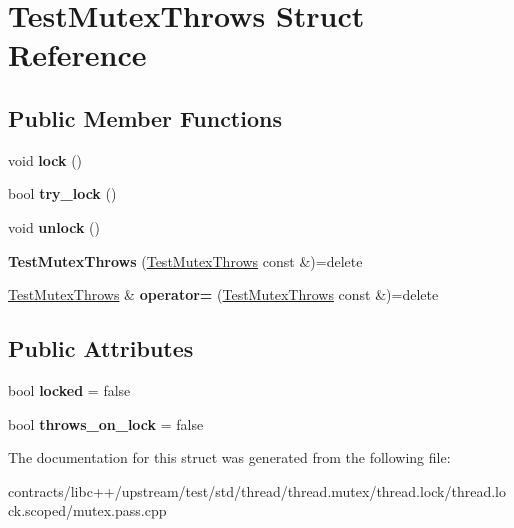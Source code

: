 \hypertarget{struct_test_mutex_throws}{}\section{Test\+Mutex\+Throws Struct Reference}
\label{struct_test_mutex_throws}
\subsection*{Public Member Functions}
\begin{DoxyCompactItemize}
\item 
\mbox{\label{struct_test_mutex_throws_ab1e5815213222effa040b122420acc91}} 
void {\bfseries lock} ()
\item 
\mbox{\label{struct_test_mutex_throws_a74e74d33801095e871483e64bfdf7c4d}} 
bool {\bfseries try\+\_\+lock} ()
\item 
\mbox{\label{struct_test_mutex_throws_ac4fdcccac372bf889f0925f5180dab7e}} 
void {\bfseries unlock} ()
\item 
\mbox{\label{struct_test_mutex_throws_a6c9215b7a0f63a972b3ddd6f621a091c}} 
{\bfseries Test\+Mutex\+Throws} (\mbox{\hyperlink{struct_test_mutex_throws}{Test\+Mutex\+Throws}} const \&)=delete
\item 
\mbox{\label{struct_test_mutex_throws_a4c33cfd1e7ae0fcbc993972ff4a57a08}} 
\mbox{\hyperlink{struct_test_mutex_throws}{Test\+Mutex\+Throws}} \& {\bfseries operator=} (\mbox{\hyperlink{struct_test_mutex_throws}{Test\+Mutex\+Throws}} const \&)=delete
\end{DoxyCompactItemize}
\subsection*{Public Attributes}
\begin{DoxyCompactItemize}
\item 
\mbox{\label{struct_test_mutex_throws_a54c6a85872f180d6fa5b2967736d77b8}} 
bool {\bfseries locked} = false
\item 
\mbox{\label{struct_test_mutex_throws_a4d18d86025134233529fd9691942708d}} 
bool {\bfseries throws\+\_\+on\+\_\+lock} = false
\end{DoxyCompactItemize}


The documentation for this struct was generated from the following file\+:\begin{DoxyCompactItemize}
\item 
contracts/libc++/upstream/test/std/thread/thread.\+mutex/thread.\+lock/thread.\+lock.\+scoped/mutex.\+pass.\+cpp\end{DoxyCompactItemize}
